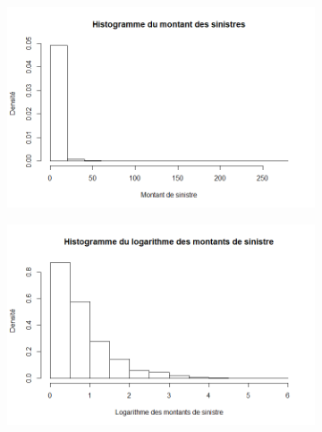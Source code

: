 		\begin{figure}[H]
			\begin{center}
			\begin{subfigure}[b]{0.3\textwidth}
				\includegraphics[scale=0.35]{Graphiques/Hist_Danish_Severite} 
				\caption{} \label{Hist_Danish_Severite}
			\end{subfigure}
			\begin{subfigure}[b]{0.3\textwidth}
				\includegraphics[scale=0.35]{Graphiques/Hist_Danish_LogSeverite} 
				\caption{} \label{Hist_Danish_LogSeverite}
			\end{subfigure}
			\begin{subfigure}[b]{0.3\textwidth}

\end{subfigure}
\end{center}
\end{figure}

